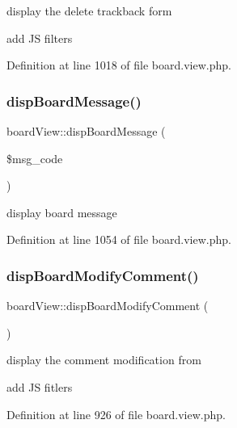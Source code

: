 display the delete trackback form 

add JS filters

Definition at line 1018 of file board.\+view.\+php.

\hypertarget{classboardView_ae42a2efcaf9e04de795a8a895a68fad4}{}\label{classboardView_ae42a2efcaf9e04de795a8a895a68fad4} 
\subsubsection{\texorpdfstring{disp\+Board\+Message()}{dispBoardMessage()}}
{\footnotesize\ttfamily board\+View\+::disp\+Board\+Message (\begin{DoxyParamCaption}\item[{}]{\$msg\+\_\+code }\end{DoxyParamCaption})}



display board message 



Definition at line 1054 of file board.\+view.\+php.

\hypertarget{classboardView_a2c26d7a7ea01ac2f6dfd1dbe9c5effce}{}\label{classboardView_a2c26d7a7ea01ac2f6dfd1dbe9c5effce} 
\subsubsection{\texorpdfstring{disp\+Board\+Modify\+Comment()}{dispBoardModifyComment()}}
{\footnotesize\ttfamily board\+View\+::disp\+Board\+Modify\+Comment (\begin{DoxyParamCaption}{ }\end{DoxyParamCaption})}



display the comment modification from 

add JS fitlers

Definition at line 926 of file board.\+view.\+php.

\hypertarget{classboardView_a3257103149e6136e3c0706b26d180dcb}{}\label{classboardView_a3257103149e6136e3c0706b26d180dcb} 
